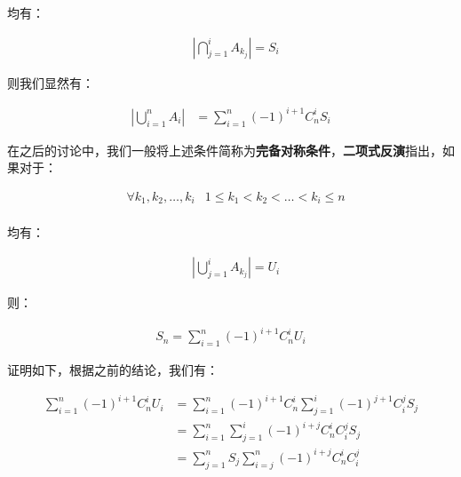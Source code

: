 \documentclass[UTF8]{book}
\begin{document}
均有：
\begin{large}
    \begin{equation}
        \begin{aligned}
            &\left | \bigcap_{j=1}^iA_{k_j} \right | = S_i
            \nonumber
        \end{aligned}
    \end{equation}
\end{large}
则我们显然有：
\begin{large}
    \begin{equation}
        \begin{aligned}
            \left | \bigcup_{i=1}^{n}A_i \right | &= \sum_{i=1}^{n}(-1)^{i+1}C_n^iS_i
            \nonumber
        \end{aligned}
    \end{equation}
\end{large}
在之后的讨论中，我们一般将上述条件简称为\textbf{完备对称条件}，\textbf{二项式反演}指出，如果对于：
\begin{large}
    \begin{equation}
        \begin{aligned}
            &\forall k_1, k_2, \dots, k_i & 1 \le k_1 < k_2 < \dots < k_i \le n\\
            \nonumber
        \end{aligned}
    \end{equation}
\end{large}
均有：
\begin{large}
    \begin{equation}
        \begin{aligned}
            &\left | \bigcup_{j=1}^iA_{k_j} \right | = U_i
            \nonumber
        \end{aligned}
    \end{equation}
\end{large}
则：
\begin{large}
    \begin{equation}
        \begin{aligned}
            S_n=\sum_{i=1}^n(-1)^{i+1}C_n^iU_i
            \nonumber
        \end{aligned}
    \end{equation}
\end{large}
证明如下，根据之前的结论，我们有：
\begin{large}
    \begin{equation}
        \begin{aligned}
            \sum_{i=1}^n(-1)^{i+1}C_n^iU_i &=\sum_{i=1}^n(-1)^{i+1}C_n^i\sum_{j=1}^i(-1)^{j+1}C_i^jS_j \\
            &= \sum_{i=1}^n\sum_{j=1}^i(-1)^{i+j}C_n^iC_i^jS_j \\
            &= \sum_{j=1}^nS_j\sum_{i=j}^n(-1)^{i+j}C_n^iC_i^j \\
            \nonumber
        \end{aligned}
    \end{equation}
\end{large}
\end{document}

